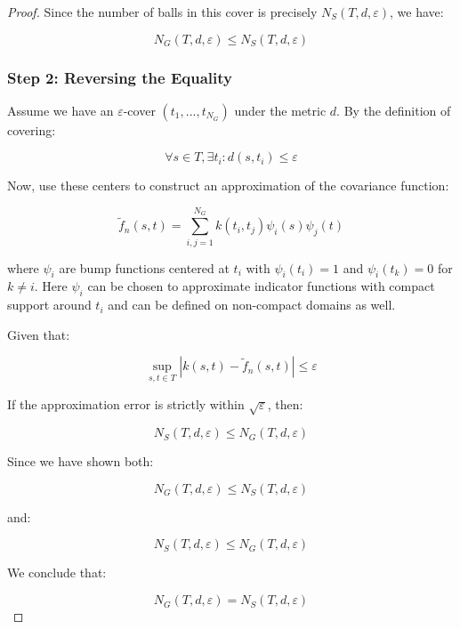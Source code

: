 \begin{proof}
Since the number of balls in this cover is precisely $N_S(T,d,\varepsilon)$, we have:

\[N_G(T,d,\varepsilon) \leq N_S(T,d,\varepsilon)\]

\subsubsection*{Step 2: Reversing the Equality}

Assume we have an $\varepsilon$-cover $(t_1, ..., t_{N_G})$ under the metric $d$. By the definition of covering:

\[\forall s \in T, \exists t_i : d(s,t_i) \leq \varepsilon\]

Now, use these centers to construct an approximation of the covariance function:

\[\tilde{f}_n(s,t) = \sum_{i,j=1}^{N_G} k(t_i,t_j)\psi_i(s)\psi_j(t)\]

where $\psi_i$ are bump functions centered at $t_i$ with $\psi_i(t_i)=1$ and $\psi_i(t_k)=0$ for $k \neq i$. Here $\psi_i$ can be chosen to approximate indicator functions with compact support around $t_i$ and can be defined on non-compact domains as well. 

Given that:

\[\sup_{s,t \in T} |k(s,t) - \tilde{f}_n(s,t)| \leq \varepsilon\]

If the approximation error is strictly within $\sqrt{\varepsilon}$, then:

\[N_S(T,d,\varepsilon) \leq N_G(T,d,\varepsilon)\]

Since we have shown both:

\[N_G(T,d,\varepsilon) \leq N_S(T,d,\varepsilon)\]

and:

\[N_S(T,d,\varepsilon) \leq N_G(T,d,\varepsilon)\]

We conclude that:

\[N_G(T,d,\varepsilon) = N_S(T,d,\varepsilon)\]

\end{proof}
